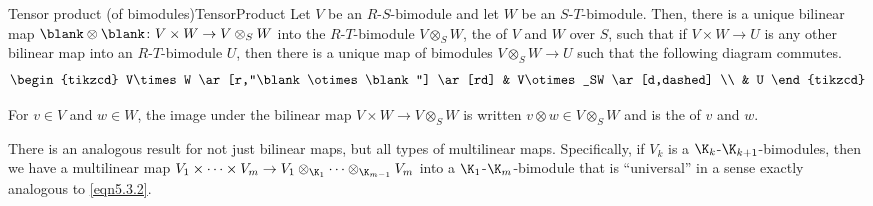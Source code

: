 \begin{thm}{Tensor product (of bimodules)}{TensorProduct}
	Let $V$ be an $R$-$S$-bimodule and let $W$ be an $S$-$T$-bimodule.  Then, there is a unique bilinear map $\blank \otimes \blank \colon V\times W\rightarrow V\otimes _SW$ into the $R$-$T$-bimodule $V\otimes _SW$, the  of $V$ and $W$ over $S$, such that if $V\times W\rightarrow U$ is any other bilinear map into an $R$-$T$-bimodule $U$, then there is a unique map of bimodules $V\otimes _SW\rightarrow U$ such that the following diagram commutes.
	\begin{equation}\label{eqn5.3.2}
	\begin{tikzcd}
	V\times W \ar[r,"\blank \otimes \blank "] \ar[rd] & V\otimes _SW \ar[d,dashed] \\
	& U
	\end{tikzcd}
	\end{equation}
	\begin{rmk}
		For $v\in V$ and $w\in W$, the image under the bilinear map $V\times W\rightarrow V\otimes _SW$ is written $v\otimes w\in V\otimes _SW$ and is the  of $v$ and $w$.
	\end{rmk}
	\begin{rmk}
		There is an analogous result for not just bilinear maps, but all types of multilinear maps.  Specifically, if $V_k$ is a $\K _k$-$\K _{k+1}$-bimodules, then we have a multilinear map $V_1\times \cdots \times V_m\rightarrow V_1\otimes _{\K _1}\cdots \otimes _{\K _{m-1}}V_m$ into a $\K _1$-$\K _m$-bimodule that is ``universal'' in a sense exactly analogous to \eqref{eqn5.3.2}.
		

\end{rmk}
\end{thm}
